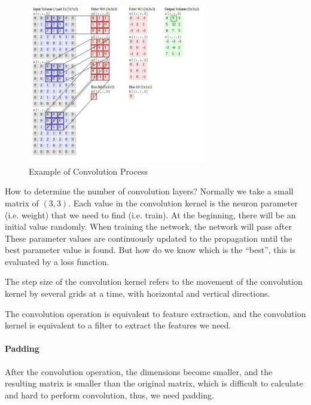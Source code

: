 \begin{figure}[h!]
\centering
\includegraphics[width=0.7\textwidth]{Convolution_Process.pdf}
\caption{Example of Convolution Process \cite{cnn1}}
\label{fig:convolutionprocess}
\end{figure}

How to determine the number of convolution layers? Normally we take a small matrix of $(3,3)$. Each value in the convolution kernel is the neuron parameter (i.e. weight) that we need to find (i.e. train). At the beginning, there will be an initial value randomly. When training the network, the network will pass after These parameter values are continuously updated to the propagation until the best parameter value is found. But how do we know which is the ``best'', this is evaluated by a loss function.

The step size of the convolution kernel refers to the movement of the convolution kernel by several grids at a time, with horizontal and vertical directions.

The convolution operation is equivalent to feature extraction, and the convolution kernel is equivalent to a filter to extract the features we need.

\paragraph{Padding}
After the convolution operation, the dimensions become smaller, and the resulting matrix is smaller than the original matrix, which is difficult to calculate and hard to perform convolution, thus, we need padding. 

